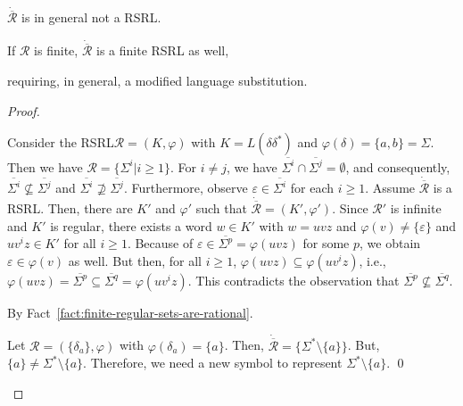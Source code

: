\documentclass[envcountsame]{llncs}
\newcommand{\rationalset}{\ensuremath{\mathcal{R}}\xspace}
\newcommand{\RegularlyGeneratedLanguageSetAbbrev}{RSRL\xspace}
\begin{document}
\begin{proposition}
  \label{prop:closure:pw-complement}
  \begin{inparaenum}
  \item\label{prop:closure:pw-complement:a}
    $\dot{\overline{\rationalset}}$ is in general not a \RegularlyGeneratedLanguageSetAbbrev.
  \item\label{prop:closure:pw-complement:b} If $\rationalset$ is
    finite, $\dot{\overline{\rationalset}}$ is a finite \RegularlyGeneratedLanguageSetAbbrev
    as well,
  \item requiring, in general, a modified language substitution.
  \end{inparaenum}
\end{proposition}

\begin{proof}
  \begin{inparaenum}[\bfseries(1)]
  \item Consider the \RegularlyGeneratedLanguageSetAbbrev $\rationalset = (K, \varphi)$ with $K =
    L(\delta\delta^*)$ and $\varphi(\delta) = \{ a, b \} = \Sigma$.
Then we have $\rationalset=\{\Sigma^i|i\ge 1\}$. 
For $i \neq j$, we have $\overline{\Sigma^i} \cap
    \overline{\Sigma^j} = \emptyset$, and consequently,
    $\overline{\Sigma^i} \not\subseteq \overline{\Sigma^j}$ and
    $\overline{\Sigma^i} \not\supseteq \overline{\Sigma^j}$.
Furthermore, observe $\varepsilon \in \overline{\Sigma^i}$ for
    each $i \geq 1$.
Assume $\dot{\overline{\rationalset}}$ is a \RegularlyGeneratedLanguageSetAbbrev.  Then,
    there are $K'$ and $\varphi'$ such that
    $\dot{\overline{\rationalset}} = (K', \varphi')$.  
Since $\rationalset'$ is infinite and $K'$ is regular, there
    exists a word $w \in K'$ with $w = uvz$ and $\varphi(v) \neq \{
    \varepsilon \}$ and $uv^iz \in K'$ for all $i \geq 1$.
Because of $\varepsilon \in \overline{\Sigma^p}= \varphi(uvz)$ for
    some $p$, we obtain $\varepsilon \in \varphi(v)$ as well.
But then, for all $i \geq 1$, $\varphi(uvz) \subseteq \varphi(uv^iz)$,
    i.e., $\varphi(uvz)=\overline{\Sigma^p} \subseteq
    \overline{\Sigma^q}=\varphi(uv^iz)$.
This contradicts the observation that $\overline{\Sigma^p}
    \not\subseteq \overline{\Sigma^q}$.
\item By Fact~\ref{fact:finite-regular-sets-are-rational}.
  \item Let $\rationalset = (\{ \delta_a \}, \varphi)$ with
    $\varphi(\delta_a) = \{ a \}$.  Then,
    $\dot{\overline{\rationalset}} = \{ \Sigma^* \setminus \{a \} \}$.
    But, $\{ a \} \neq \Sigma^* \setminus \{a \}$.  Therefore, we need
    a new symbol to represent $\Sigma^* \setminus \{ a \}$.  \qed
  \end{inparaenum}
\end{proof}
\end{document}
